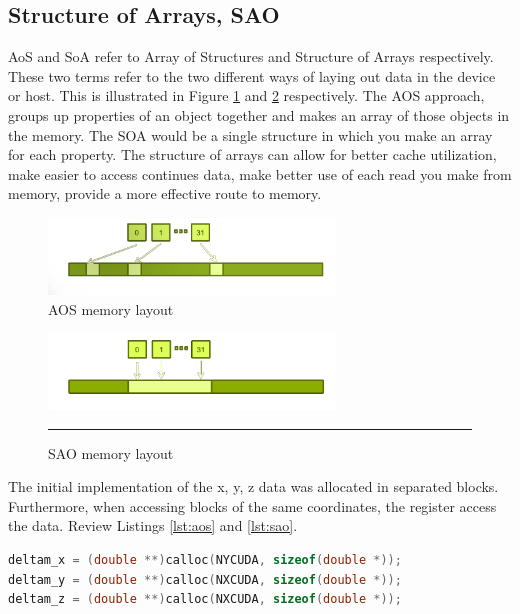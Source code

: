 \subsection{Structure of Arrays, SAO}

AoS and SoA refer to Array of Structures and Structure of Arrays respectively. These two terms refer to the two different ways of laying out data in the device or host. This is illustrated in Figure \ref{fig:aos} and \ref{fig:sao} respectively. The AOS approach, groups up properties of an object together and makes an array of those objects in the memory. The SOA would be a single structure in which you make an array for each property. The structure of arrays can allow for better cache utilization, make easier to access continues data, make better use of each read you make from memory, provide a more effective route to memory. 

\begin{figure}[htbp]
	\centering
		\includegraphics[width=0.68\textwidth]{Figures/aos.png}
		\smallskip
	\caption[Array of structures (AOS)]{AOS memory layout }
	\label{fig:aos}
\end{figure}


\begin{figure}[htbp]
	\centering
		\includegraphics[width=0.68\textwidth]{Figures/soa.png}
		\rule{35em}{0.2pt}
	\caption[Structure of Arrays (SAO)]{SAO memory layout}
	\label{fig:sao}
\end{figure}

The initial implementation of the  x, y, z data was allocated in separated blocks. Furthermore, when accessing blocks of the same coordinates, the register access the data. Review Listings \ref{lst:aos} and \ref{lst:sao}.

\begin{lstlisting}[language=C++, label={lst:aos}, caption={AOS implementation}]
deltam_x = (double **)calloc(NYCUDA, sizeof(double *));
deltam_y = (double **)calloc(NXCUDA, sizeof(double *));
deltam_z = (double **)calloc(NXCUDA, sizeof(double *));
\end{lstlisting}

